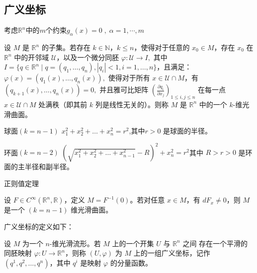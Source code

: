 \documentclass[12pt, a4paper, oneside, UTF8]{ctexbook}  %
\begin{document}
\subsection{广义坐标}
考虑\(\mathbb{R}^n\)中的\(m\)个约束\(g_\alpha(x)=0\; ,\; \alpha=1,\cdots,m\)
\begin{defn}[k维曲面]
    设 $ M $ 是 $\mathbb{R}^n$ 的子集。若存在 $ k \in \mathbb{N} $，$ k \leq n $，使得对于任意的 $ x_0 \in M $，存在 $ x_0 $ 在 $\mathbb{R}^n$ 中的开邻域 $\mathcal{U}$，以及一个微分同胚
    $
    \varphi: \mathcal{U} \to I,
    $
    其中 $ I = \{ q \in \mathbb{R}^n \mid q = (q_1, \dots, q_n), |q_i| < 1, i = 1, \dots, n \} $，且满足：
    $
    \varphi(x) = (q_1(x), \dots, q_n(x)),
    $
    使得对于所有 $ x \in \mathcal{U} \cap M $，有
    $
    (q_{k+1}(x), \dots, q_n(x)) = 0,
    $
    并且雅可比矩阵
    $
    \left( \frac{\partial q_i}{\partial x_j} \right)_{1 \leq i,j \leq n}
    $
    在每一点 $ x \in \mathcal{U} \cap M $ 处满秩（即其前 $ k $ 列是线性无关的）。则称 $ M $ 是 $\mathbb{R}^n$ 中的一个 $ k $-维光滑曲面。
    \end{defn}
\begin{example}
    球面\((k =n-1)\)
    \(x_1^2 + x_2^2 + \dots + x_n^2 = r^2\),其中\(r>0\) 是球面的半径。
\end{example}
\begin{example}
    环面\((k=n-2)\)
    \(\left( \sqrt{x_1^2 + x_2^2 + \dots + x_{n-1}^2} - R \right)^2 + x_n^2 = r^2
\)其中 \(R>r>0\) 是环面的主半径和副半径。
\end{example}
\begin{thm}
    正则值定理

    设 $ F \in C^\infty(\mathbb{R}^n, \mathbb{R}) $，定义 $ M = F^{-1}(0) $。若对任意 $ x \in M $，有 $ dF_x \neq 0 $，则 $ M $ 是一个 $ (k=n-1) $ 维光滑曲面。
\end{thm}
广义坐标的定义如下：

设 $ M $ 为一个 $ n $-维光滑流形。若 $ M $ 上的一个开集 $ U $ 与 $ \mathbb{R}^n $ 之间
存在一个平滑的同胚映射 $ \varphi: U \rightarrow \mathbb{R}^n $，则称 $ (U, \varphi) $ 
为 $ M $ 上的一组广义坐标，记作 $ (q^1, q^2, \dots, q^n) $，其中 $ q^i $ 是映射 $ \varphi $ 的分量函数。
\end{document}
